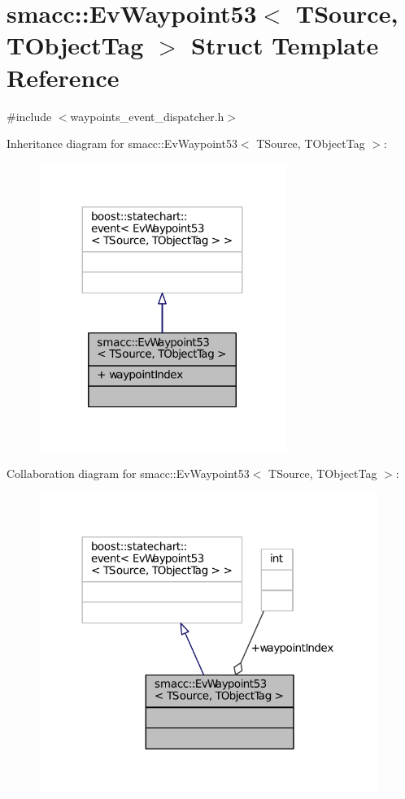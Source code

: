 \hypertarget{structsmacc_1_1EvWaypoint53}{}\section{smacc\+:\+:Ev\+Waypoint53$<$ T\+Source, T\+Object\+Tag $>$ Struct Template Reference}
\label{structsmacc_1_1EvWaypoint53}


{\ttfamily \#include $<$waypoints\+\_\+event\+\_\+dispatcher.\+h$>$}



Inheritance diagram for smacc\+:\+:Ev\+Waypoint53$<$ T\+Source, T\+Object\+Tag $>$\+:
\nopagebreak
\begin{figure}[H]
\begin{center}
\leavevmode
\includegraphics[width=227pt]{structsmacc_1_1EvWaypoint53__inherit__graph}
\end{center}
\end{figure}


Collaboration diagram for smacc\+:\+:Ev\+Waypoint53$<$ T\+Source, T\+Object\+Tag $>$\+:
\nopagebreak
\begin{figure}[H]
\begin{center}
\leavevmode
\includegraphics[width=312pt]{structsmacc_1_1EvWaypoint53__coll__graph}
\end{center}
\end{figure}
